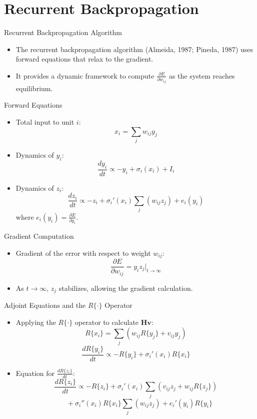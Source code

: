\documentclass{beamer}
\begin{document}
\section{Recurrent Backpropagation}
\begin{frame}{Recurrent Backpropagation Algorithm}
    \begin{itemize}
        \item The recurrent backpropagation algorithm (Almeida, 1987; Pineda, 1987) uses forward equations that relax to the gradient.
        \item It provides a dynamic framework to compute \( \frac{\partial E}{\partial w_{ij}} \) as the system reaches equilibrium.
    \end{itemize}
\end{frame}

\begin{frame}{Forward Equations}
    \begin{itemize}
        \item Total input to unit \( i \):
        \[
        x_i = \sum_j w_{ij} y_j
        \]
        \item Dynamics of \( y_i \):
        \[
        \frac{d y_i}{d t} \propto -y_i + \sigma_i(x_i) + I_i
        \]
        \item Dynamics of \( z_i \):
        \[
        \frac{d z_i}{d t} \propto -z_i + \sigma_i'(x_i) \sum_j (w_{ij} z_j) + e_i(y_i)
        \]
        where \( e_i(y_i) = \frac{\partial E}{\partial y_i} \).
    \end{itemize}
\end{frame}

\begin{frame}{Gradient Computation}
    \begin{itemize}
        \item Gradient of the error with respect to weight \( w_{ij} \):
        \[
        \frac{\partial E}{\partial w_{ij}} = y_i z_j \big|_{t \to \infty}
        \]
        \item As \( t \rightarrow \infty \), \( z_j \) stabilizes, allowing the gradient calculation.
    \end{itemize}
\end{frame}

\begin{frame}{Adjoint Equations and the \( R\{\cdot\} \) Operator}
    \begin{itemize}
        \item Applying the \( R\{\cdot\} \) operator to calculate \( \mathbf{H}\mathbf{v} \):
        \[
        R\{x_i\} = \sum_j (w_{ij} R\{y_j\} + v_{ij} y_j)
        \]
        \[
        \frac{d R\{y_i\}}{d t} \propto -R\{y_i\} + \sigma_i'(x_i) R\{x_i\}
        \]
        \item Equation for \( \frac{d R\{z_i\}}{d t} \):
        \[
        \frac{d R\{z_i\}}{d t} \propto -R\{z_i\} + \sigma_i'(x_i) \sum_j \left( v_{ij} z_j + w_{ij} R\{z_j\} \right) 
        \]
        \[
        \quad + \sigma_i''(x_i) R\{x_i\} \sum_j (w_{ij} z_j) + e_i'(y_i) R\{y_i\}
        \]
    \end{itemize}
\end{frame}
\end{document}
